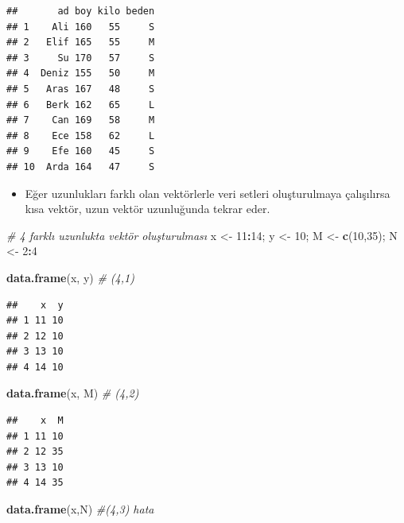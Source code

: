 \documentclass[
  oneside]{book}
\newenvironment{Shaded}{\begin{snugshade}}{\end{snugshade}}
\newcommand{\CommentTok}[1]{\textcolor[rgb]{0.56,0.35,0.01}{\textit{#1}}}
\newcommand{\DecValTok}[1]{\textcolor[rgb]{0.00,0.00,0.81}{#1}}
\newcommand{\FunctionTok}[1]{\textcolor[rgb]{0.13,0.29,0.53}{\textbf{#1}}}
\newcommand{\NormalTok}[1]{#1}
\newcommand{\OtherTok}[1]{\textcolor[rgb]{0.56,0.35,0.01}{#1}}
\newcommand{\SpecialCharTok}[1]{\textcolor[rgb]{0.81,0.36,0.00}{\textbf{#1}}}
\providecommand{\tightlist}{%
  \setlength{\itemsep}{0pt}\setlength{\parskip}{0pt}}
\begin{document}
\begin{verbatim}
##       ad boy kilo beden
## 1    Ali 160   55     S
## 2   Elif 165   55     M
## 3     Su 170   57     S
## 4  Deniz 155   50     M
## 5   Aras 167   48     S
## 6   Berk 162   65     L
## 7    Can 169   58     M
## 8    Ece 158   62     L
## 9    Efe 160   45     S
## 10  Arda 164   47     S
\end{verbatim}

\begin{itemize}
\tightlist
\item
  Eğer uzunlukları farklı olan vektörlerle veri setleri oluşturulmaya çalışılırsa kısa vektör, uzun vektör uzunluğunda tekrar eder.
\end{itemize}

\begin{Shaded}
\begin{Highlighting}[]
\CommentTok{\# 4 farklı uzunlukta vektör oluşturulması}
\NormalTok{x }\OtherTok{\textless{}{-}} \DecValTok{11}\SpecialCharTok{:}\DecValTok{14}\NormalTok{; y }\OtherTok{\textless{}{-}} \DecValTok{10}\NormalTok{; M }\OtherTok{\textless{}{-}} \FunctionTok{c}\NormalTok{(}\DecValTok{10}\NormalTok{,}\DecValTok{35}\NormalTok{); N }\OtherTok{\textless{}{-}} \DecValTok{2}\SpecialCharTok{:}\DecValTok{4}
\end{Highlighting}
\end{Shaded}

\begin{Shaded}
\begin{Highlighting}[]
\FunctionTok{data.frame}\NormalTok{(x, y) }\CommentTok{\# (4,1)}
\end{Highlighting}
\end{Shaded}

\begin{verbatim}
##    x  y
## 1 11 10
## 2 12 10
## 3 13 10
## 4 14 10
\end{verbatim}

\begin{Shaded}
\begin{Highlighting}[]
\FunctionTok{data.frame}\NormalTok{(x, M) }\CommentTok{\# (4,2)}
\end{Highlighting}
\end{Shaded}

\begin{verbatim}
##    x  M
## 1 11 10
## 2 12 35
## 3 13 10
## 4 14 35
\end{verbatim}

\begin{Shaded}
\begin{Highlighting}[]
\FunctionTok{data.frame}\NormalTok{(x,N)  }\CommentTok{\#(4,3) hata}
\end{Highlighting}
\end{Shaded}
\end{document}
